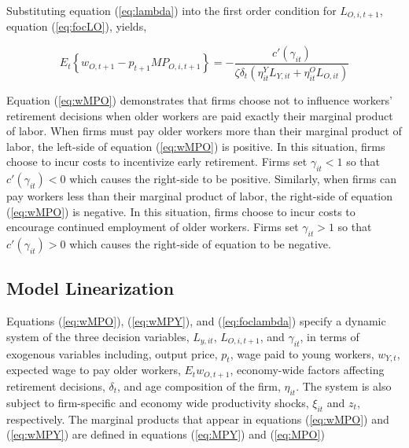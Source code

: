 \documentclass[11pt]{article}
\newcommand{\beq}{\begin{equation}}
\newcommand{\eeq}{\end{equation}}
\begin{document}
Substituting equation (\ref{eq:lambda}) into the first order condition for $L_{O,i,t+1}$, equation (\ref{eq:focLO}), yields,

\beq \label{eq:wMPO} E_t \left\{w_{O,t+1} - p_{t+1} MP_{O,i,t+1} \right\} = - \frac{c'(\gamma_{it})}{\zeta \delta_{t} \left(\eta_{it}^Y L_{Y,it} + \eta_{it}^O L_{O,it}\right)} \eeq

Equation (\ref{eq:wMPO}) demonstrates that firms choose not to influence workers' retirement decisions when older workers are paid exactly their marginal product of labor. When firms must pay older workers more than their marginal product of labor, the left-side of equation (\ref{eq:wMPO}) is positive. In this situation, firms choose to incur costs to incentivize early retirement. Firms set $\gamma_{it}<1$ so that $c'(\gamma_{it})<0$ which causes the right-side to be positive. Similarly, when firms can pay workers less than their marginal product of labor, the right-side of equation (\ref{eq:wMPO}) is negative. In this situation, firms choose to incur costs to encourage continued employment of older workers. Firms set $\gamma_{it}>1$ so that $c'(\gamma_{it})>0$ which causes the right-side of equation to be negative.

\subsection{Model Linearization}

Equations (\ref{eq:wMPO}), (\ref{eq:wMPY}), and (\ref{eq:foclambda}) specify a dynamic system of the three decision variables, $L_{y,it}$, $L_{O,i,t+1}$, and $\gamma_{it}$, in terms of exogenous variables including, output price, $p_t$, wage paid to young workers, $w_{Y,t}$, expected wage to pay older workers, $E_t w_{O,t+1}$, economy-wide factors affecting retirement decisions, $\delta_t$, and age composition of the firm, $\eta_{it}$. The system is also subject to firm-specific and economy wide productivity shocks, $\xi_{it}$ and $z_t$, respectively. The marginal products that appear in equations (\ref{eq:wMPO}) and (\ref{eq:wMPY}) are defined in equations (\ref{eq:MPY}) and (\ref{eq:MPO})
\end{document}
